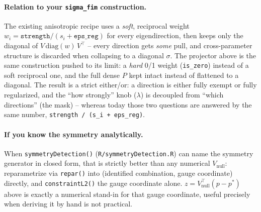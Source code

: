 \documentclass[11pt]{article}
\newcommand{\code}[1]{\texttt{#1}}
\newcommand{\file}[1]{\textcolor{black!60}{\texttt{#1}}}
\begin{document}
\paragraph{Relation to your \code{sigma\_fim} construction.} The existing
anisotropic recipe uses a \emph{soft}, reciprocal weight $w_i =
\texttt{strength}/(s_i+\texttt{eps\_reg})$ for every eigendirection, then
keeps only the diagonal of $V\,\mathrm{diag}(w)\,V^\top$ -- every direction
gets \emph{some} pull, and cross-parameter structure is discarded when
collapsing to a diagonal $\sigma$. The projector above is the same
construction pushed to its limit: a \emph{hard} 0/1 weight (\code{is\_zero})
instead of a soft reciprocal one, and the full dense $P$ kept intact instead
of flattened to a diagonal. The result is a strict either/or: a direction is
either fully exempt or fully regularized, and the ``how strongly'' knob
($\lambda$) is decoupled from ``which directions'' (the mask) -- whereas
today those two questions are answered by the same number,
\code{strength / (s\_i + eps\_reg)}.

\paragraph{If you know the symmetry analytically.} When
\code{symmetryDetection()} (\file{R/symmetryDetection.R}) can name the
symmetry generator in closed form, that is strictly better than any
numerical $V_{\mathrm{null}}$: reparametrize via \code{repar()} into
(identified combination, gauge coordinate) directly, and
\code{constraintL2()} the gauge coordinate alone. $z = V_{\mathrm{null}}^\top
(p-p^*)$ above is exactly a numerical stand-in for that gauge coordinate,
useful precisely when deriving it by hand is not practical.
\end{document}
